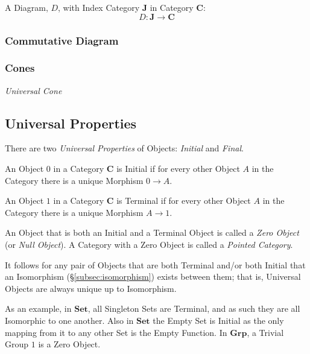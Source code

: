A Diagram, $D$, with Index Category $\mathbf{J}$ in Category
$\mathbf{C}$:
\[
    D : \mathbf{J} \rightarrow \mathbf{C}
\]

\subsubsection{Commutative Diagram}\label{subsec:commutative_diagram}

\subsubsection{Cones}\label{subsec:category_cone}

\emph{Universal Cone}

\subsection{Universal Properties}\label{subsec:universal_property}

There are two \emph{Universal Properties} of Objects: \emph{Initial}
and \emph{Final}.

An Object $0$ in a Category $\mathbf{C}$ is Initial if for every other
Object $A$ in the Category there is a unique Morphism $0 \rightarrow
A$.

An Object $1$ in a Category $\mathbf{C}$ is Terminal if for every
other Object $A$ in the Category there is a unique Morphism $A
\rightarrow 1$.

An Object that is both an Initial and a Terminal Object is called a
\emph{Zero Object} (or \emph{Null Object}). A Category with a Zero
Object is called a \emph{Pointed Category}.

It follows for any pair of Objects that are both Terminal and/or both
Initial that an Isomorphism (\S\ref{subsec:isomorphism}) exists
between them; that is, Universal Objects are always unique up to
Isomorphism.

As an example, in $\mathbf{Set}$, all Singleton Sets are Terminal, and
as such they are all Isomorphic to one another. Also in $\mathbf{Set}$
the Empty Set is Initial as the only mapping from it to any other Set
is the Empty Function. In $\mathbf{Grp}$, a Trivial Group ${1}$ is a
Zero Object.

